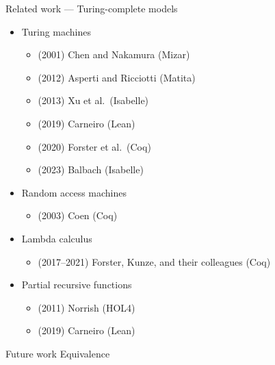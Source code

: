 \documentclass{beamer}
\begin{document}
	\begin{frame}{Related work --- Turing-complete models}
	\begin{itemize}
		\item Turing machines
		\begin{itemize}
			\item (2001) Chen and Nakamura (Mizar)
			\item (2012) Asperti and Ricciotti (Matita)
			\item (2013) Xu et al.\ (Isabelle)
			\item (2019) Carneiro (Lean)
			\item (2020) Forster et al.\ (Coq)
			\item (2023) Balbach (Isabelle)
		\end{itemize}
		\item Random access machines
		\begin{itemize}
			\item (2003) Coen (Coq)
		\end{itemize}
		\item Lambda calculus
		\begin{itemize}
			\item (2017--2021) Forster, Kunze, and their colleagues (Coq)
		\end{itemize}
		\item Partial recursive functions
		\begin{itemize}
			\item (2011) Norrish (HOL4)
			\item (2019) Carneiro (Lean)
		\end{itemize}
	\end{itemize}
	\end{frame}
	
	\begin{frame}{Future work}
		Equivalence
	\end{frame}
	
\end{document}
